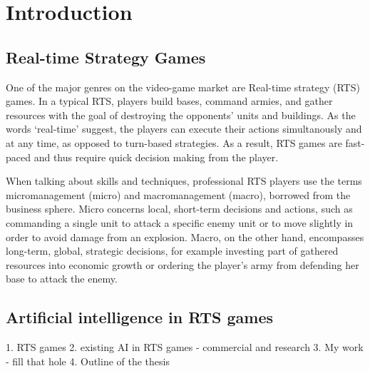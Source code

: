 \chapter{Introduction}

\section{Real-time Strategy Games}

One of the major genres on the video-game market are Real-time strategy (RTS) games. In a typical RTS, players build bases, command armies, and gather resources with the goal of destroying the opponents' units and buildings. As the words `real-time' suggest, the players can execute their actions simultanously and at any time, as opposed to turn-based strategies. As a result, RTS games are fast-paced and thus require quick decision making from the player. 

When talking about skills and techniques, professional RTS players use the terms micromanagement (micro) and macromanagement (macro), borrowed from the business sphere. Micro concerns local, short-term decisions and actions, such as commanding a single unit to attack a specific enemy unit or to move slightly in order to avoid damage from an explosion. Macro, on the other hand, encompasses long-term, global, strategic decisions, for example investing part of gathered resources into economic growth or ordering the player's army from defending her base to attack the enemy.

\section{Artificial intelligence in RTS games}



1. RTS games
2. existing AI in RTS games - commercial and research
3. My work - fill that hole
4. Outline of the thesis